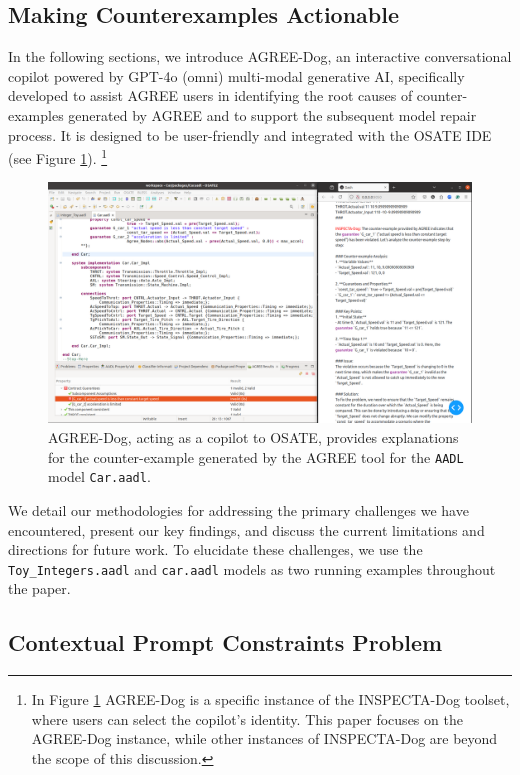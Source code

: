 \subsection{Making Counterexamples Actionable} 
In the following sections, we introduce AGREE-Dog, an interactive conversational copilot powered by GPT-4o (omni) multi-modal generative AI, specifically developed to assist AGREE users in identifying the root causes of counter-examples generated by AGREE and to support the subsequent model repair process. It is designed to be user-friendly and integrated with the OSATE IDE (see Figure \ref{fig:AGREEDOG}). \footnote{In Figure \ref{fig:AGREEDOG} AGREE-Dog is a specific instance of the INSPECTA-Dog toolset, where users can select the copilot's identity. This paper focuses on the AGREE-Dog instance, while other instances of INSPECTA-Dog are beyond the scope of this discussion.}

\begin{figure}[htbp]  
    \centering
    \includegraphics[width=\textwidth]{AGREE-DOG-high-rs.png}%
    \caption{AGREE-Dog, acting as a copilot to OSATE, provides explanations for the counter-example generated by the AGREE tool for the \texttt{AADL} model \texttt{Car.aadl}.}
    \label{fig:AGREEDOG}
\end{figure}


 We detail our methodologies for addressing the primary challenges we have encountered, present our key findings, and discuss the current limitations and directions for future work. To elucidate these challenges, we use the \texttt{Toy\_Integers.aadl} and \texttt{car.aadl} models as two running examples throughout the paper.

\subsection{Contextual Prompt Constraints Problem}

